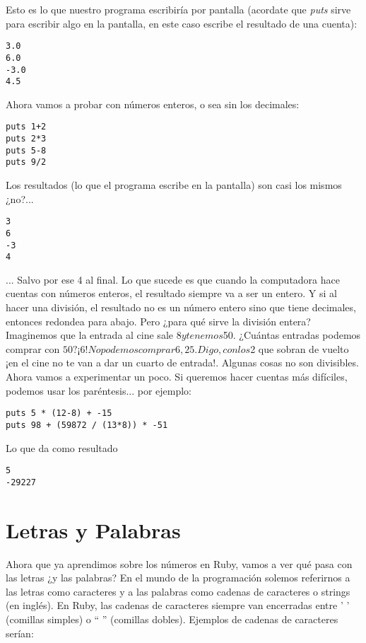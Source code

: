 Esto es lo que nuestro programa escribiría por pantalla (acordate que \emph{puts} sirve para escribir algo en la pantalla, en este caso escribe el resultado de una cuenta):
\begin{lstlisting}
3.0
6.0
-3.0
4.5
\end{lstlisting}

Ahora vamos a probar con números enteros, o sea sin los decimales:

\begin{lstlisting}
puts 1+2
puts 2*3
puts 5-8
puts 9/2
\end{lstlisting}

Los resultados (lo que el programa escribe en la pantalla) son casi los mismos ¿no?...

\begin{lstlisting}
3
6
-3
4
\end{lstlisting}

... Salvo por ese 4 al final. Lo que sucede es que cuando la computadora hace cuentas con números enteros, el resultado siempre va a ser un entero. Y si  al hacer una división, el resultado no es un número entero sino que tiene decimales, entonces redondea para abajo. Pero ¿para qué sirve la división entera?\\

Imaginemos que la entrada al cine sale $8 y tenemos $50. ¿Cuántas entradas podemos comprar con $50? ¡6! No podemos comprar 6,25. Digo, con los $2 que sobran de vuelto ¡en el cine no te van a dar un cuarto de entrada!. Algunas cosas no son divisibles.\\

Ahora vamos a experimentar un poco. Si queremos hacer cuentas más difíciles, podemos usar los paréntesis... por ejemplo:

\begin{lstlisting}
puts 5 * (12-8) + -15
puts 98 + (59872 / (13*8)) * -51
\end{lstlisting}

Lo que da como resultado
\begin{lstlisting}
5
-29227
\end{lstlisting}

\section{Letras y Palabras}
Ahora que ya aprendimos sobre los números en Ruby, vamos a ver qué pasa con las letras ¿y las palabras? En el mundo de la programación solemos referirnos a las letras como caracteres y a las palabras como cadenas de caracteres o strings (en inglés). En Ruby, las cadenas de caracteres siempre van encerradas entre ' ' (comillas simples) o “ ” (comillas dobles). Ejemplos de cadenas de caracteres serían:

